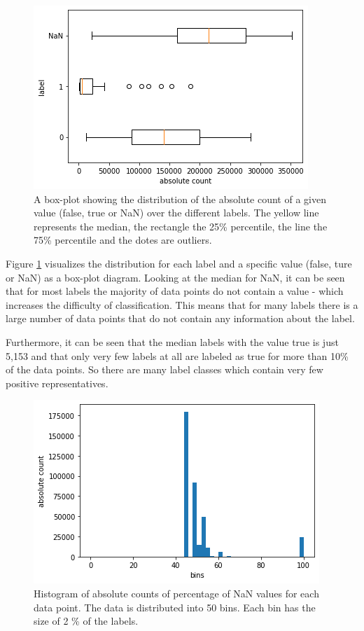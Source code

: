 \documentclass[a4paper,12pt]{scrartcl}
\begin{document}
\begin{figure}[H]
	\begin{center}
		\includegraphics[scale=.8]{images/boxplot_label.png}
		\caption{A box-plot showing the distribution of the absolute count of a given value (false, true or NaN) over the different labels. The yellow line represents the median, the rectangle the 25\% percentile, the line the 75\% percentile and the dotes are outliers.}
		\label{abb:boxplot_label}
	\end{center}		
\end{figure}	

Figure \ref{abb:boxplot_label} visualizes the distribution for each label and a specific value (false, ture or NaN) as a box-plot diagram. Looking at the median for NaN, it can be seen that for most labels the majority of data points do not contain a value - which increases the difficulty of classification. This means that for many labels there is a large number of data points that do not contain any information about the label.

Furthermore, it can be seen that the median labels with the value true is just 5,153 and that only very few labels at all are labeled as true for more than 10\% of the data points. So there are many label classes which contain very few positive representatives. 

\begin{figure}[H]
	\begin{center}
		\includegraphics[scale=.8]{images/hist.png}
		\caption{Histogram of absolute counts of percentage of NaN values for each data point. The data is distributed into 50 bins. Each bin has the size of 2 \% of the labels.}
		\label{abb:histogramm_data}
	\end{center}		
\end{figure}
\end{document}
